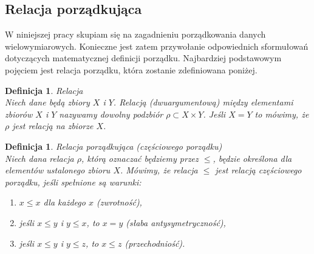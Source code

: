 \documentclass[12pt,a4paper]{report}
\newtheorem{definition}[theorem]{Definicja}
\begin{document}
\subsection{Relacja porządkująca}
\noindent

W niniejszej pracy skupiam się na zagadnieniu porządkowania danych wielowymiarowych. Konieczne jest zatem przywołanie odpowiednich sformułowań dotyczących matematycznej definicji porządku. Najbardziej podstawowym pojęciem jest relacja porządku, która zostanie zdefiniowana poniżej. 


\begin{definition}{Relacja \cite[Rozdział 3]{kuratowski2004}\\}
Niech dane będą zbiory $X$ i $Y$. Relacją (dwuargumentową) między elementami zbiorów $X$ i $Y$ nazywamy dowolny podzbiór $\rho \subset X \times Y $. Jeśli $X=Y$ to mówimy, że $\rho$ jest relacją na zbiorze $X$. \\
\end{definition} 

\begin{definition}{Relacja porządkująca (częściowego porządku) \cite[Rozdział 2]{blaszczyk2007}\\}
Niech dana relacja $\rho$, którą oznaczać będziemy przez $\leq$, będzie określona dla elementów ustalonego zbioru $X$. Mówimy, że relacja $\leq$ jest relacją częściowego porządku, jeśli spełnione są warunki:
\begin{enumerate}
\item $x \leq x$ dla każdego $x$ (zwrotność),
\item jeśli $x \leq y$ i $y \leq x$, to $x=y$ (słaba antysymetryczność),
\item jeśli $x \leq y$ i $y \leq z$, to $x \leq z$ (przechodniość).\\
\end{enumerate}
\end{definition}
\end{document}

